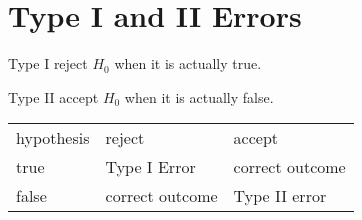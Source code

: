 \documentclass[landscape]{exam}
\begin{document}
  \section{Type I and II Errors}
  \begin{description*}
    \item[Type I] reject $H_0$ when it is actually true.
    \item[Type II] accept $H_0$ when it is actually false.
  \end{description*}

  \begin{tabular}[H]{lll}
     hypothesis & reject          & accept \\
     true       & Type I Error    & correct outcome \\
     false      & correct outcome & Type II error \\
  \end{tabular}
\end{document}
